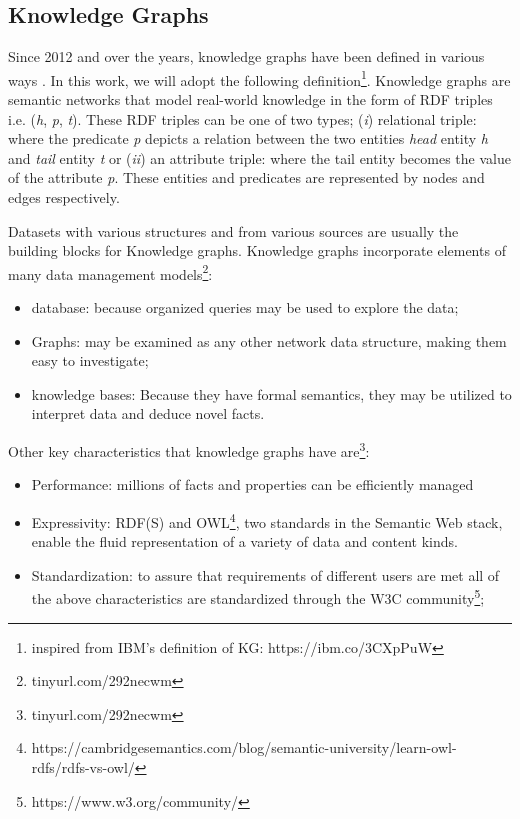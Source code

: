 \subsection{Knowledge Graphs}
Since 2012 and over the years, knowledge graphs have been defined in various ways\newline
\cite{ehrlinger2016towards}.\newline
In this work, we will adopt the following definition\footnote{\label{fn1}inspired from IBM's definition of KG: https://ibm.co/3CXpPuW}.\newline
Knowledge graphs are semantic networks that model real-world knowledge in the form of RDF triples i.e. (\textit{h}, \textit{p}, \textit{t}). These RDF triples can be one of two types; (\textit{i}) relational triple: where the predicate \textit{p} depicts a relation between the two entities \textit{head} entity \textit{h} and \textit{tail} entity \textit{t} or (\textit{ii}) an attribute triple: where the tail entity becomes the value of the attribute \textit{p}.
These entities and predicates are represented by nodes and edges respectively.\newline

Datasets with various structures and from various sources are usually the building blocks for Knowledge graphs. Knowledge graphs incorporate elements of many data management models\footnote{
tinyurl.com/292necwm}:
\begin{itemize}
\item{database: because organized queries may be used to explore the data;}
\item{Graphs: may be examined as any other network data structure, making them easy to investigate;}
\item{knowledge bases: Because they have formal semantics, they may be utilized to interpret data and deduce novel facts.}
\end{itemize}
\noindent Other key characteristics that knowledge graphs have are\footnote{
tinyurl.com/292necwm}:
\begin{itemize}
\item{Performance: millions of facts and properties can be efficiently managed}
\item{Expressivity: RDF(S) and OWL\footnote{https://cambridgesemantics.com/blog/semantic-university/learn-owl-rdfs/rdfs-vs-owl/}, two standards in the Semantic Web stack, enable the fluid representation of a variety of data and content kinds.}
\item{Standardization: to assure that requirements of different users are met all of the above characteristics are standardized through the W3C community\footnote{https://www.w3.org/community/};}
\end{itemize}


